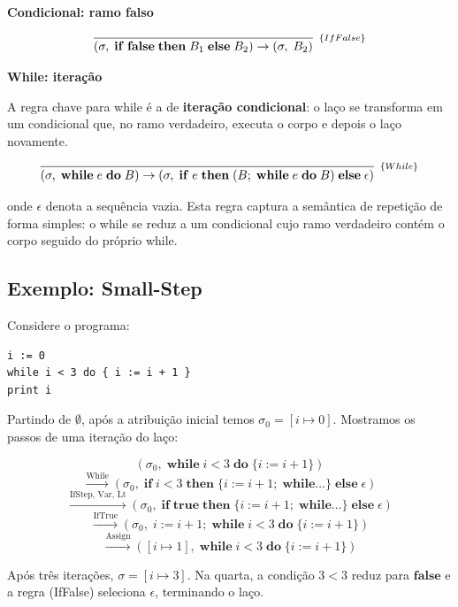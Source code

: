 \textbf{Condicional: ramo falso}

\[
  \infer[_{\{IfFalse\}}]{(\sigma,\; \mathbf{if}\; \mathbf{false}\;
      \mathbf{then}\;
  B_1\; \mathbf{else}\; B_2) \to (\sigma,\; B_2)}{}
\]

\textbf{While: iteração}

A regra chave para while é a de
\textbf{iteração condicional}: o laço se transforma em um condicional que,
no ramo verdadeiro, executa o corpo e depois o laço novamente.

\[
  \infer[_{\{While\}}]{(\sigma,\; \mathbf{while}\; e\; \mathbf{do}\; B) \to
    (\sigma,\; \mathbf{if}\; e\; \mathbf{then}\; (B;\; \mathbf{while}\;
  e\; \mathbf{do}\; B)\; \mathbf{else}\; \epsilon)}{}
\]

onde \(\epsilon\) denota a sequência vazia. Esta regra captura a
semântica de repetição de forma simples: o
while se reduz a um condicional cujo ramo
verdadeiro contém o corpo seguido do próprio while.

\subsection{Exemplo: Small-Step}

Considere o programa:

\begin{verbatim}
i := 0
while i < 3 do { i := i + 1 }
print i
\end{verbatim}

Partindo de \(\emptyset\), após a atribuição inicial temos \(\sigma_0
= [i \mapsto 0]\). Mostramos os passos de uma iteração do laço:

\[
  (\sigma_0,\; \mathbf{while}\; i < 3\; \mathbf{do}\; \{i
  \mathbin{:=} i+1\})
\] \[
  \xrightarrow{\text{While}}
  (\sigma_0,\; \mathbf{if}\; i < 3\; \mathbf{then}\; \{i \mathbin{:=}
  i+1;\; \mathbf{while}\ldots\}\; \mathbf{else}\; \epsilon)
\] \[
  \xrightarrow{\text{IfStep, Var, Lt}}
  (\sigma_0,\; \mathbf{if}\; \mathbf{true}\; \mathbf{then}\; \{i
  \mathbin{:=} i+1;\; \mathbf{while}\ldots\}\; \mathbf{else}\; \epsilon)
\] \[
  \xrightarrow{\text{IfTrue}}
  (\sigma_0,\; i \mathbin{:=} i+1;\; \mathbf{while}\; i < 3\;
  \mathbf{do}\; \{i \mathbin{:=} i+1\})
\] \[
  \xrightarrow{\text{Assign}}
  ([i \mapsto 1],\; \mathbf{while}\; i < 3\; \mathbf{do}\; \{i
  \mathbin{:=} i+1\})
\]

Após três iterações, \(\sigma = [i \mapsto 3]\). Na quarta, a
condição \(3 < 3\) reduz para \(\mathbf{false}\) e a regra (IfFalse)
seleciona \(\epsilon\), terminando o laço.

